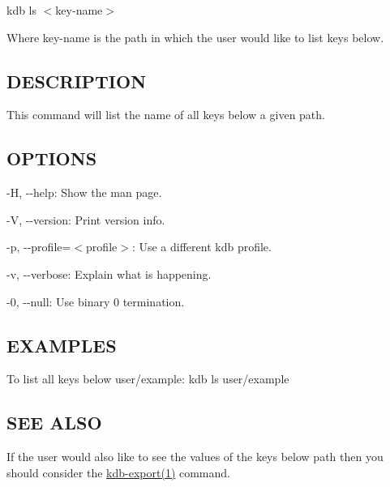 {\ttfamily kdb ls $<$key-\/name$>$}

Where {\ttfamily key-\/name} is the path in which the user would like to list keys below.

\subsection*{D\+E\+S\+C\+R\+I\+P\+T\+I\+O\+N}

This command will list the name of all keys below a given path.

\subsection*{O\+P\+T\+I\+O\+N\+S}


\begin{DoxyItemize}
\item {\ttfamily -\/\+H}, {\ttfamily -\/-\/help}\+: Show the man page.
\item {\ttfamily -\/\+V}, {\ttfamily -\/-\/version}\+: Print version info.
\item {\ttfamily -\/p}, {\ttfamily -\/-\/profile}=$<$profile$>$\+: Use a different kdb profile.
\item {\ttfamily -\/v}, {\ttfamily -\/-\/verbose}\+: Explain what is happening.
\item {\ttfamily -\/0}, {\ttfamily -\/-\/null}\+: Use binary 0 termination.
\end{DoxyItemize}

\subsection*{E\+X\+A\+M\+P\+L\+E\+S}

To list all keys below {\ttfamily user/example}\+: {\ttfamily kdb ls user/example}

\subsection*{S\+E\+E A\+L\+S\+O}

If the user would also like to see the values of the keys below {\ttfamily path} then you should consider the \hyperlink{md_doc_help_kdb-export_doc_help_kdb-export_md}{kdb-\/export(1)} command. 